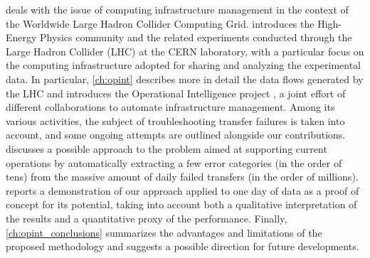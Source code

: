  deals with the issue of computing infrastructure management in the context of the Worldwide Large Hadron Collider Computing Grid.
 introduces the High-Energy Physics community and the related experiments conducted through the Large Hadron Collider (LHC) at the CERN laboratory, with a particular focus on the computing infrastructure adopted for sharing and analyzing the experimental data. 
In particular, \cref{ch:opint} describes more in detail the data flows generated by the LHC and introduces the Operational Intelligence project \cite{opint2020}, a joint effort of different collaborations to automate infrastructure management.
Among its various activities, the subject of troubleshooting transfer failures is taken into account, and some ongoing attempts are outlined alongside our contributions.
 discusses a possible approach to the problem aimed at supporting current operations by automatically extracting a few error categories (in the order of tens) from the massive amount of daily failed transfers (in the order of millions).
 reports a demonstration of our approach applied to one day of data as a proof of concept for its potential, taking into account both a qualitative interpretation of the results and a quantitative proxy of the performance.
Finally, \cref{ch:opint_conclusions} summarizes the advantages and limitations of the proposed methodology and suggests a possible direction for future developments.


